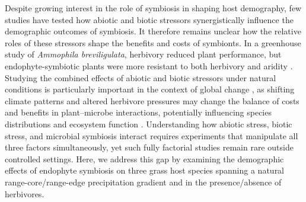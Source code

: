\documentclass[12pt]{article}\usepackage[]{graphicx}\usepackage[dvipsnames]{xcolor}
\begin{document}
Despite growing interest in the role of symbiosis in shaping host demography, few studies have tested how abiotic and biotic stressors synergistically influence the demographic outcomes of symbiosis. 
It therefore remains unclear how the relative roles of these stressors shape the benefits and costs of symbionts. 
In a greenhouse study of \emph{Ammophila breviligulata}, herbivory reduced  plant performance, but endophyte-symbiotic plants were more resistant to both herbivory and aridity \citep{emery2010variation}.
Studying the combined effects of abiotic and biotic stressors under natural conditions is particularly important in the context of global change \citep{louthan2015and}, as shifting climate patterns and altered herbivore pressures may change the balance of costs and benefits in plant–microbe interactions, potentially influencing species distributions and ecosystem function \citep{reynolds2003grassroots}.
Understanding how abiotic stress, biotic stress, and microbial symbiosis interact requires experiments that manipulate all three factors simultaneously, yet such fully factorial studies remain rare outside controlled settings.
Here, we address this gap by examining the demographic effects of endophyte symbiosis on three grass host species spanning a natural range-core/range-edge precipitation gradient and in the presence/absence of herbivores.
\end{document}
